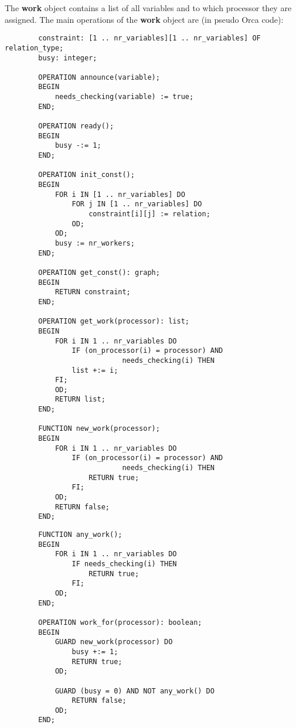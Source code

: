 \documentclass[a4paper,11pt]{article}
\begin{document}
The {\bf work} object contains a list of all variables and to which
processor they are assigned. The main operations 
of the {\bf work} object are (in pseudo Orca code):
\begin{verbatim}
        constraint: [1 .. nr_variables][1 .. nr_variables] OF relation_type;
        busy: integer;

        OPERATION announce(variable);
        BEGIN
            needs_checking(variable) := true;
        END;

        OPERATION ready();
        BEGIN
            busy -:= 1;
        END;

        OPERATION init_const();
        BEGIN
            FOR i IN [1 .. nr_variables] DO
                FOR j IN [1 .. nr_variables] DO
                    constraint[i][j] := relation;
                OD;
            OD;
            busy := nr_workers;
        END;

        OPERATION get_const(): graph;
        BEGIN
            RETURN constraint;
        END;

        OPERATION get_work(processor): list;
        BEGIN
            FOR i IN 1 .. nr_variables DO
                IF (on_processor(i) = processor) AND
                            needs_checking(i) THEN
        	    list +:= i;
        	FI;
            OD;
            RETURN list;
        END;
        
        FUNCTION new_work(processor);
        BEGIN
            FOR i IN 1 .. nr_variables DO
                IF (on_processor(i) = processor) AND
                            needs_checking(i) THEN
                    RETURN true;
                FI;
            OD;
            RETURN false;
        END;
\end{verbatim}
\pagebreak
\begin{verbatim}
        FUNCTION any_work();
        BEGIN
            FOR i IN 1 .. nr_variables DO
                IF needs_checking(i) THEN
                    RETURN true;
                FI;
            OD;
        END;
        
        OPERATION work_for(processor): boolean;
        BEGIN
            GUARD new_work(processor) DO
                busy +:= 1;
                RETURN true;
            OD;
        
            GUARD (busy = 0) AND NOT any_work() DO
                RETURN false;
            OD;
        END;
\end{verbatim}
\end{document}
